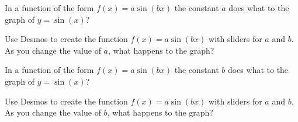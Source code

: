 \documentclass{ximera}
\begin{document}
\begin{question}
In a function of the form $f(x)=a\sin(bx)$ the constant $a$ does what to the graph of $y=\sin(x)$?

    \begin{multipleChoice}
    \end{multipleChoice}
    \begin{hint}
    Use Desmos to create the function $f(x)=a\sin(bx)$ with sliders for $a$ and $b$. As you change the value of $a$, what happens to the graph?
    \end{hint}

\end{question}

\begin{question}
In a function of the form $f(x)=a\sin(bx)$ the constant $b$ does what to the graph of $y=\sin(x)$?

    \begin{multipleChoice}
    \end{multipleChoice}
    \begin{hint}
    Use Desmos to create the function $f(x)=a\sin(bx)$ with sliders for $a$ and $b$. As you change the value of $b$, what happens to the graph?
    \end{hint}

\end{question}
\end{document}
